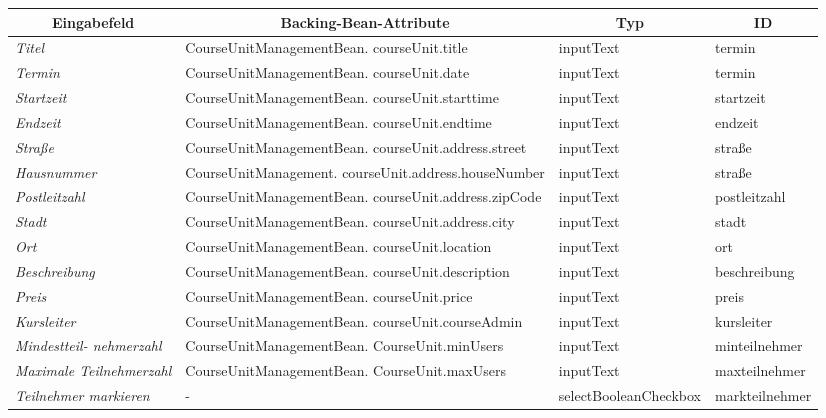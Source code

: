 \begin{itemize}
				\begin{center}
					\begin{longtable}{|p{3cm} |p{6cm} | p{4cm}|p{3cm}|}
						
						\hline \multicolumn{1}{|c|}{\textbf{Eingabefeld}} & \multicolumn{1}{|c|}{\textbf{Backing-Bean-Attribute}} & \multicolumn{1}{|c|}{\textbf{Typ}}  &  \multicolumn{1}{|c|}{\textbf{ID}} \\ \hline
						\endfirsthead
						\hline
						\endlastfoot
						\textit{Titel} & CourseUnitManagementBean. courseUnit.title & inputText & termin \\ \hline
						\textit{Termin} & CourseUnitManagementBean. courseUnit.date & inputText & termin \\ \hline
						\textit{Startzeit} & CourseUnitManagementBean. courseUnit.starttime & inputText & startzeit \\ \hline
						\textit{Endzeit} & CourseUnitManagementBean. courseUnit.endtime & inputText & endzeit \\ \hline
						\textit{Straße} & CourseUnitManagementBean. courseUnit.address.street & inputText & straße\\ \hline
						\textit{Hausnummer} & CourseUnitManagement. courseUnit.address.houseNumber & inputText & straße\\ \hline
						\textit{Postleitzahl} & CourseUnitManagementBean. courseUnit.address.zipCode & inputText & postleitzahl \\ \hline
						\textit{Stadt} & CourseUnitManagementBean. courseUnit.address.city & inputText & stadt \\ \hline
						\textit{Ort} & CourseUnitManagementBean. courseUnit.location & inputText & ort \\ \hline
						\textit{Beschreibung} & CourseUnitManagementBean. courseUnit.description & inputText & beschreibung\\ \hline
						\textit{Preis} & CourseUnitManagementBean. courseUnit.price & inputText & preis \\ \hline
						\textit{Kursleiter} & CourseUnitManagementBean. courseUnit.courseAdmin & inputText & kursleiter \\ \hline
						\textit{Mindestteil- nehmerzahl} & CourseUnitManagementBean. CourseUnit.minUsers & inputText & minteilnehmer \\ \hline
						\textit{Maximale Teilnehmerzahl} & CourseUnitManagementBean. CourseUnit.maxUsers & inputText & maxteilnehmer \\ \hline
						\textit{Teilnehmer markieren} & - & selectBooleanCheckbox & markteilnehmer \\ \hline

\end{longtable}
\end{center}
\end{itemize}
